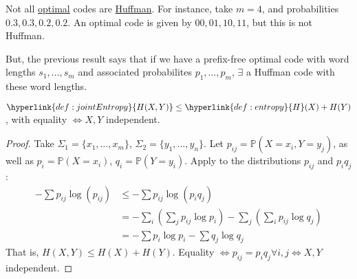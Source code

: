 \documentclass{article}
\newcommand{\Prob}{\mathbb{P}}
\newcommand{\1}[1]{\mathbbm{1}_{#1}}
\begin{document}
\begin{remark}
    Not all \hyperlink{def:optCode}{optimal} codes are \hyperlink{def:huffmanCode}{Huffman}. For instance, take $m=4$, and probabilities $0.3, 0.3, 0.2, 0.2$. An optimal code is given by $00, 01, 10, 11$, but this is not Huffman.

    But, the previous result says that if we have a prefix-free optimal code with word lengths $s_1, \dotsc, s_m$ and associated probabilites $p_1, \dotsc, p_m$, $\exists$ a Huffman code with these word lengths.
\end{remark}


\begin{nlemma}\label{lem:1.7}
    $\hyperlink{def:jointEntropy}{H(X, Y)} \leq \hyperlink{def:entropy}{H}(X) + H(Y)$, with equality $\iff X,Y$ independent.
\end{nlemma}

\begin{proof}
    Take $\Sigma_1 = \{x_1, \dotsc, x_m\}$, $\Sigma_2 = \{y_1, \dotsc, y_n\}$. Let $p_{ij} = \Prob(X=x_i, Y=y_j)$, as well as $p_i = \Prob(X=x_i)$, $q_i = \Prob(Y=y_i)$.
    Apply  to the distributions $p_{ij}$ and $p_i q_j$:
    \begin{align*}
        -\sum p_{ij} \log(p_{ij}) &\leq -\sum p_{ij} \log(p_i q_j) \\
                                  &= - \sum_i \left(\sum_j p_{ij} \log p_i\right) - \sum_j \left(\sum_i p_{ij} \log q_j\right) \\
                                  &= -\sum p_i \log p_i - \sum q_j \log q_j
    \end{align*}
    That is, $H(X,Y) \leq H(X) + H(Y)$.
    Equality $\iff p_{ij} = p_i q_j \forall i, j \iff X, Y$ independent.
\end{proof}
\end{document}

